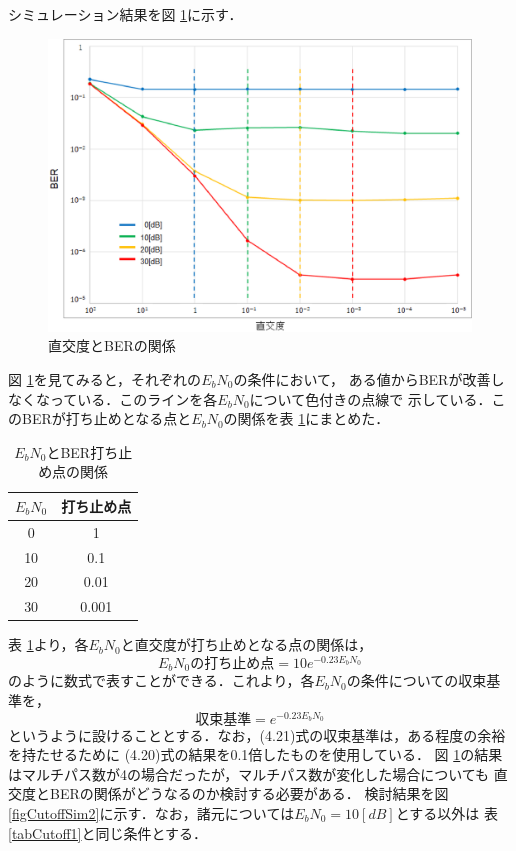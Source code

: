 シミュレーション結果を図 \ref{figCutoffSim1}に示す．

\begin{figure}[t]
    \centering
    \includegraphics[width=0.95\linewidth]{chapter4/figure/CutoffSim1.eps}
    \caption{直交度とBERの関係}
    \label{figCutoffSim1}
\end{figure}

図 \ref{figCutoffSim1}を見てみると，それぞれの$E_bN_0$の条件において，
ある値からBERが改善しなくなっている．このラインを各$E_bN_0$について色付きの点線で
示している．このBERが打ち止めとなる点と$E_bN_0$の関係を表 \ref{tabCutoff2}にまとめた．

\begin{table}[t]
    \begin{tabular}{|c|c|} \hline
        $E_bN_0$ & 打ち止め点 \\ \hline
        0 & 1 \\ \hline
        10 & 0.1 \\ \hline
        20 & 0.01 \\ \hline
        30 & 0.001 \\ \hline
    \end{tabular}
    \centering
    \caption{$E_bN_0$とBER打ち止め点の関係}
    \label{tabCutoff2}
\end{table}

表 \ref{tabCutoff2}より，各$E_bN_0$と直交度が打ち止めとなる点の関係は，
\begin{equation}
    E_bN_0の打ち止め点 = 10e^{-0.23E_bN_0}
\end{equation}
のように数式で表すことができる．これより，各$E_bN_0$の条件についての収束基準を，
\begin{equation}
    収束基準 = e^{-0.23E_bN_0}
\end{equation}
というように設けることとする．なお，(4.21)式の収束基準は，ある程度の余裕を持たせるために
(4.20)式の結果を0.1倍したものを使用している．
図 \ref{figCutoffSim1}の結果はマルチパス数が4の場合だったが，マルチパス数が変化した場合についても
直交度とBERの関係がどうなるのか検討する必要がある．
検討結果を図 \ref{figCutoffSim2}に示す．なお，諸元については$E_bN_0=10[dB]$とする以外は
表 \ref{tabCutoff1}と同じ条件とする．

